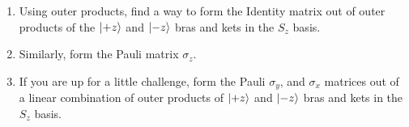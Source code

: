 \documentclass{article}
\begin{document}
      \begin{enumerate}[label=(\alph*)]
      \item Using outer products, find a way to form the Identity matrix out of outer products of the $\ket{+z}$ and $\ket{-z}$ bras and kets in the $S_{z}$ basis.
      \vspace{4cm}
      \item Similarly, form the Pauli matrix $\sigma_{z}.$
      \vspace{2cm}
      \item If you are up for a little challenge, form the Pauli $\sigma_{y}$, and $\sigma_{x}$ matrices out of a linear combination of outer products of $\ket{+z}$ and $\ket{-z}$ bras and kets in the $S_{z}$ basis.
  \end{enumerate}
\end{document}
